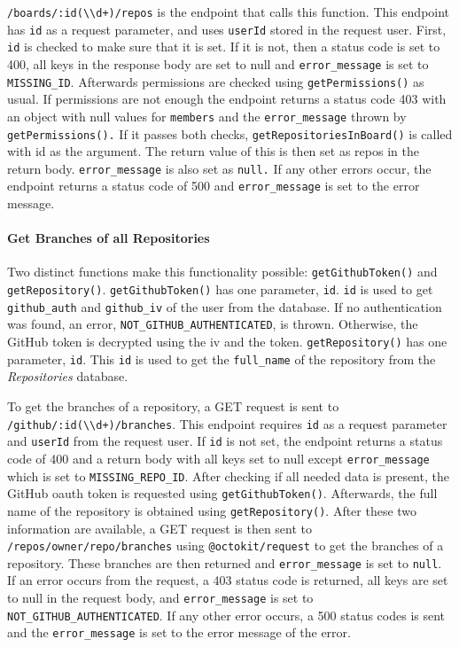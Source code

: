 \documentclass{article}
\def\code#1{\texttt{#1}}
\begin{document}
\code{/boards/:id(\textbackslash{}\textbackslash{}d+)/repos} is the endpoint
that calls this function. This endpoint has \code{id} as a request parameter,
and uses \code{userId} stored in the request user. First, \code{id} is checked
to make sure that it is set. If it is not, then a status code is set to 400, all
keys in the response body are set to null and \code{error\_message} is set to
\code{MISSING\_ID}. Afterwards permissions are checked using
\code{getPermissions()} as usual. If permissions are not enough the endpoint
returns a status code 403 with an object with null values for \code{members} and
the \code{error\_message} thrown by \code{getPermissions().} If it passes both
checks, \code{getRepositoriesInBoard()} is called with id as the argument. The
return value of this is then set as repos in the return body.
\code{error\_message} is also set as \code{null.} If any other errors occur, the
endpoint returns a status code of 500 and \code{error\_message} is set to the
error message.

\paragraph{Get Branches of all Repositories}
Two distinct functions make this functionality possible: \code{getGithubToken()}
and \code{getRepository()}. \code{getGithubToken()} has one parameter,
\code{id}. \code{id} is used to get \code{github\_auth} and \code{github\_iv} of
the user from the database. If no authentication was found, an error,
\code{NOT\_GITHUB\_AUTHENTICATED}, is thrown. Otherwise, the GitHub token is
decrypted using the iv and the token. \code{getRepository()} has one parameter,
\code{id}. This \code{id} is used to get the \code{full\_name} of the repository
from the \emph{Repositories} database.

To get the branches of a repository, a GET request is sent to
\code{/github/:id(\textbackslash{}\textbackslash{}d+)/branches}. This endpoint
requires \code{id} as a request parameter and \code{userId} from the request
user. If \code{id} is not set, the endpoint returns a status code of 400 and a
return body with all keys set to null except \code{error\_message} which is set
to \code{MISSING\_REPO\_ID}. After checking if all needed data is present, the
GitHub oauth token is requested using \code{getGithubToken()}. Afterwards, the
full name of the repository is obtained using \code{getRepository()}. After
these two information are available, a GET request is then sent to
\code{/repos/{owner}/{repo}/branches} using \code{@octokit/request} to get the
branches of a repository. These branches are then returned and
\code{error\_message} is set to \code{null}. If an error occurs from the
request, a 403 status code is returned, all keys are set to null in the request
body, and \code{error\_message} is set to \code{NOT\_GITHUB\_AUTHENTICATED}. If
any other error occurs, a 500 status codes is sent and the \code{error\_message}
is set to the error message of the error.
\end{document}
